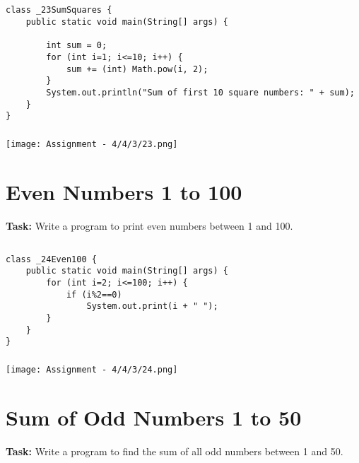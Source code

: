 \documentclass[12pt,a4paper]{article}
\begin{document}
\subsection{}
\begin{lstlisting}
class _23SumSquares {
    public static void main(String[] args) {
    
        int sum = 0;
        for (int i=1; i<=10; i++) {
            sum += (int) Math.pow(i, 2);
        }
        System.out.println("Sum of first 10 square numbers: " + sum);
    }
}
\end{lstlisting}

\subsubsection{}
\begin{center}
    \texttt{[image: Assignment - 4/4/3/23.png]}
\end{center}


\section{Even Numbers 1 to 100}
\textbf{Task:} Write a program to print even numbers between 1 and 100.

\subsection{}
\begin{lstlisting}
class _24Even100 {
    public static void main(String[] args) {
        for (int i=2; i<=100; i++) {
            if (i%2==0)
                System.out.print(i + " ");
        }
    }
}
\end{lstlisting}

\subsubsection{}
\begin{center}
    \texttt{[image: Assignment - 4/4/3/24.png]}
\end{center}


\section{Sum of Odd Numbers 1 to 50}
\textbf{Task:} Write a program to find the sum of all odd numbers between 1 and 50.
\end{document}
